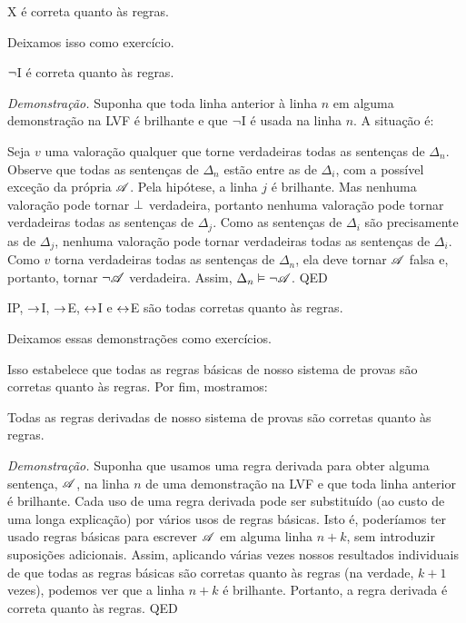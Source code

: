 \begin{factoidboxe}
	X é correta quanto às regras.
\end{factoidboxe}

Deixamos isso como exercício.

\begin{factoidboxe}
	$\neg$I é correta quanto às regras.
\end{factoidboxe}

\emph{Demonstração.}
	Suponha que toda linha anterior à linha $n$ em alguma demonstração na LVF é brilhante e que $\neg$I é usada na linha $n$. A situação é:
\begin{fitchproof}
   \open
	   \AS
   \close
\end{fitchproof}\noindent
Seja $v$ uma valoração qualquer que torne verdadeiras todas as sentenças de $\Delta_n$. Observe que todas as sentenças de $\Delta_n$ estão entre as de $\Delta_i$, com a possível exceção da própria $\mathscr{A}$. Pela hipótese, a linha $j$ é brilhante. Mas nenhuma valoração pode tornar $\bot$ verdadeira, portanto nenhuma valoração pode tornar verdadeiras todas as sentenças de $\Delta_j$. Como as sentenças de $\Delta_i$ são precisamente as de $\Delta_j$, nenhuma valoração pode tornar verdadeiras todas as sentenças de $\Delta_i$. Como $v$ torna verdadeiras todas as sentenças de $\Delta_n$, ela deve tornar $\mathscr{A}$ falsa e, portanto, tornar $\neg \mathscr{A}$ verdadeira. Assim, $\Delta_n \vDash \neg \mathscr{A}$.
QED


\begin{factoidboxe}\label{lem:LastRuleSound} IP, $\rightarrow$I, $\rightarrow$E, $\leftrightarrow$I e $\leftrightarrow$E são todas corretas quanto às regras.
\end{factoidboxe}

Deixamos essas demonstrações como exercícios.

Isso estabelece que todas as regras básicas de nosso sistema de provas são corretas quanto às regras. Por fim, mostramos:

\begin{factoidboxe}Todas as regras derivadas de nosso sistema de provas são corretas quanto às regras.
\end{factoidboxe}

\emph{Demonstração.}
	Suponha que usamos uma regra derivada para obter alguma sentença, $\mathscr{A}$, na linha $n$ de uma demonstração na LVF e que toda linha anterior é brilhante. Cada uso de uma regra derivada pode ser substituído (ao custo de uma longa explicação) por vários usos de regras básicas. Isto é, poderíamos ter usado regras básicas para escrever $\mathscr{A}$ em alguma linha $n+k$, sem introduzir suposições adicionais. Assim, aplicando várias vezes nossos resultados individuais de que todas as regras básicas são corretas quanto às regras (na verdade, $k+1$ vezes), podemos ver que a linha $n+k$ é brilhante. Portanto, a regra derivada é correta quanto às regras.
QED


